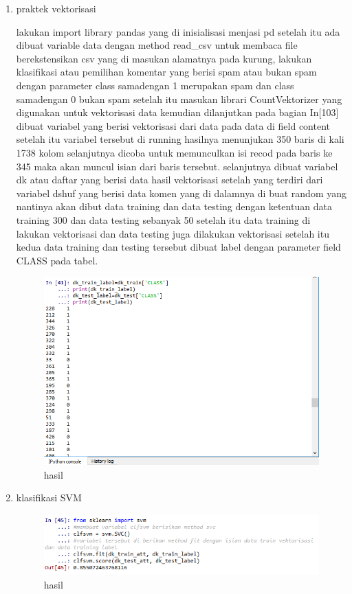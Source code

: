 \begin{enumerate}
\item praktek vektorisasi
	
\par lakukan import library pandas yang di inisialisasi menjasi pd setelah itu ada dibuat variable data dengan method read\_csv untuk membaca file berekstensikan csv yang di masukan alamatnya pada kurung, lakukan klasifikasi atau pemilihan komentar yang berisi spam atau bukan spam dengan parameter class samadengan 1 merupakan spam dan class samadengan 0 bukan spam setelah itu masukan librari CountVektorizer yang digunakan untuk vektorisasi data kemudian dilanjutkan pada bagian In[103] dibuat variabel yang berisi vektorisasi dari data pada data di field content setelah itu variabel tersebut di running hasilnya menunjukan 350 baris di kali 1738 kolom selanjutnya dicoba untuk memunculkan isi recod pada baris ke 345 maka akan muncul isian dari baris tersebut. selanjutnya dibuat variabel dk atau daftar yang berisi data hasil vektorisasi setelah yang terdiri dari variabel dshuf yang berisi data komen yang di dalamnya di buat random yang nantinya akan dibut data training dan data testing dengan ketentuan data training 300 dan data testing sebanyak 50 setelah itu data training di lakukan vektorisasi dan data testing juga dilakukan vektorisasi setelah itu kedua data training dan testing tersebut dibuat label dengan parameter field CLASS pada tabel.
\begin{figure}[H]
\centering
\includegraphics[scale=0.7]{figures/1174012/chapter4/8.PNG}
\caption{hasil}
\label{Praktek no 3}
\end{figure}		

\item klasifikasi SVM

\begin{figure}[H]
\centering
\includegraphics[scale=0.7]{figures/1174012/chapter4/9.PNG}
\caption{hasil}
\label{Praktek no 4}
\end{figure}		


\end{enumerate}
